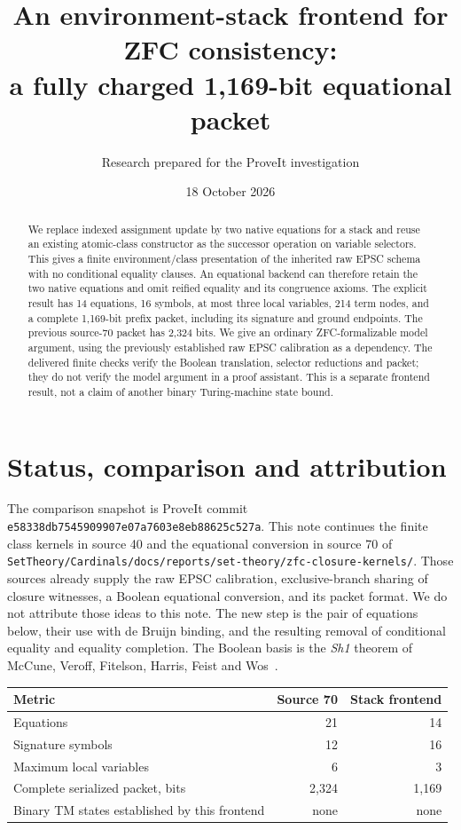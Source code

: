 \documentclass[11pt]{article}
\title{An environment-stack frontend for ZFC consistency:\\a fully charged 1,169-bit equational packet}
\author{Research prepared for the ProveIt investigation}
\date{18 October 2026}
\begin{document}
\maketitle
\begin{abstract}
We replace indexed assignment update by two native equations for a stack and reuse an existing atomic-class constructor as the successor operation on variable selectors. This gives a finite environment/class presentation of the inherited raw EPSC schema with no conditional equality clauses. An equational backend can therefore retain the two native equations and omit reified equality and its congruence axioms. The explicit result has 14 equations, 16 symbols, at most three local variables, 214 term nodes, and a complete 1,169-bit prefix packet, including its signature and ground endpoints. The previous source-70 packet has 2,324 bits. We give an ordinary ZFC-formalizable model argument, using the previously established raw EPSC calibration as a dependency. The delivered finite checks verify the Boolean translation, selector reductions and packet; they do not verify the model argument in a proof assistant. This is a separate frontend result, not a claim of another binary Turing-machine state bound.
\end{abstract}

\section{Status, comparison and attribution}

The comparison snapshot is ProveIt commit
\texttt{e58338db7545909907e07a7603e8eb88625c527a}.
This note continues the finite class kernels in source 40 and the equational conversion in source 70 of
\texttt{SetTheory/Cardinals/docs/reports/set-theory/zfc-closure-kernels/}.
Those sources already supply the raw EPSC calibration, exclusive-branch sharing of closure witnesses, a Boolean equational conversion, and its packet format. We do not attribute those ideas to this note. The new step is the pair of equations below, their use with de Bruijn binding, and the resulting removal of conditional equality and equality completion. The Boolean basis is the \emph{Sh1} theorem of McCune, Veroff, Fitelson, Harris, Feist and Wos~\cite{sh1}.

\begin{center}
\begin{tabular}{lrr}
\toprule
Metric & Source 70 & Stack frontend \\
\midrule
Equations & 21 & 14\\
Signature symbols & 12 & 16\\
Maximum local variables & 6 & 3\\
Complete serialized packet, bits & 2,324 & 1,169\\
Binary TM states established by this frontend & none & none\\
\bottomrule
\end{tabular}
\end{center}
\end{document}
